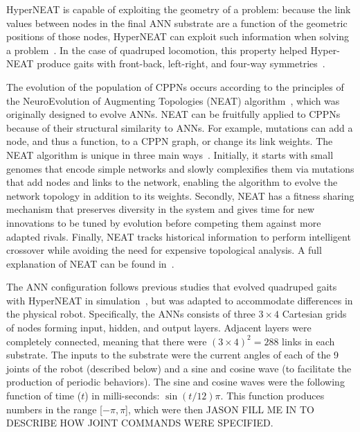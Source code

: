 HyperNEAT is capable of exploiting the geometry of a problem: because
the link values between nodes in the final ANN substrate are a
function of the geometric positions of those nodes, HyperNEAT can
exploit such information when solving a
problem~\cite{stanley2009hypercube, clune2009sensitivity,
  clune2011performance}. In the case of quadruped locomotion, this
property helped Hyper-NEAT produce gaits with front-back, left-right,
and four-way symmetries~\cite{clune2009evolving,
  clune2011performance}.
  
The evolution of the population of CPPNs occurs according to the
principles of the NeuroEvolution of Augmenting Topologies (NEAT)
algorithm~\cite{stanley2002evolving}, which was originally designed to
evolve ANNs. NEAT can be fruitfully applied to CPPNs because of their
structural similarity to ANNs. For example, mutations can add a node,
and thus a function, to a CPPN graph, or change its link weights. The
NEAT algorithm is unique in three main
ways~\cite{stanley2002evolving}. Initially, it starts with small
genomes that encode simple networks and slowly complexifies them via
mutations that add nodes and links to the network, enabling the
algorithm to evolve the network topology in addition to its
weights. Secondly, NEAT has a fitness sharing mechanism that preserves
diversity in the system and gives time for new innovations to be tuned
by evolution before competing them against more adapted
rivals. Finally, NEAT tracks historical information to perform
intelligent crossover while avoiding the need for expensive
topological analysis. A full explanation of NEAT can be found
in~\cite{stanley2002evolving}.
  
The ANN configuration follows previous studies that evolved quadruped
gaits with HyperNEAT in simulation~\cite{clune2011performance,
  clune2009evolving}, but was adapted to accommodate differences in
the physical robot. Specifically, the ANNs consists of three $3 \times 4$
Cartesian grids of nodes forming input, hidden, and output
layers. Adjacent layers were completely connected, meaning that there
were $(3 \times 4)^2= 288$ links in each substrate. The inputs to the
substrate were the current angles of each of the 9 joints of the robot
(described below) and a sine and cosine wave (to facilitate the
production of periodic behaviors). The sine and cosine waves were the
following function of time ($t$) in milli-seconds:
$\sin(t/12)\pi$. This function produces numbers in the range [$-\pi,
  \pi$], which were then JASON FILL ME IN TO DESCRIBE HOW JOINT
COMMANDS WERE SPECIFIED.

